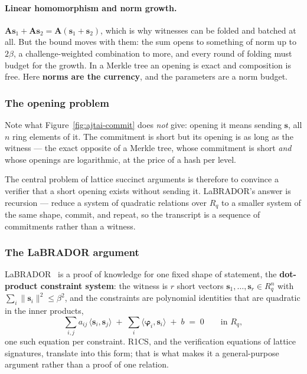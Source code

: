 \paragraph{Linear homomorphism and norm growth.}
$\mathbf{A}\mathbf{s}_1+\mathbf{A}\mathbf{s}_2=\mathbf{A}(\mathbf{s}_1+\mathbf{s}_2)$,
which is why witnesses can be folded and batched at all. But the bound moves
with them: the sum opens to something of norm up to $2\beta$, a challenge-weighted
combination to more, and every round of folding must budget for the growth. In a
Merkle tree an opening is exact and composition is free. Here \textbf{norms are
the currency}, and the parameters are a norm budget.

\subsubsection{The opening problem}
Note what Figure~\ref{fig:ajtai-commit} does \emph{not} give: opening it means
sending $\mathbf{s}$, all $n$ ring elements of it. The commitment is short but
its opening is as long as the witness --- the exact opposite of a Merkle tree,
whose commitment is short \emph{and} whose openings are logarithmic, at the price
of a hash per level.

The central problem of lattice succinct arguments is therefore to convince a
verifier that a short opening exists without sending it. LaBRADOR's answer is
recursion --- reduce a system of quadratic relations
over $R_q$ to a smaller system of the same shape, commit, and repeat, so the
transcript is a sequence of commitments rather than a witness.

\subsubsection{The LaBRADOR argument}
\label{sec:labrador-outline}
LaBRADOR~\cite{labrador2023} is a proof of knowledge for one fixed shape of
statement, the \textbf{dot-product constraint system}: the witness is $r$ short
vectors $\mathbf{s}_1,\dots,\mathbf{s}_r\in R_q^{n}$ with
$\sum_i\|\mathbf{s}_i\|^2\le\beta^2$, and the constraints are polynomial
identities that are quadratic in the inner products,
\[
  \sum_{i,j} a_{ij}\,\langle \mathbf{s}_i,\mathbf{s}_j\rangle
  \;+\;\sum_i \langle \boldsymbol{\varphi}_i,\mathbf{s}_i\rangle
  \;+\; b \;=\; 0 \qquad\text{in } R_q ,
\]
one such equation per constraint. R1CS, and the verification equations of
lattice signatures, translate into this form; that is what makes it a
general-purpose argument rather than a proof of one relation.

